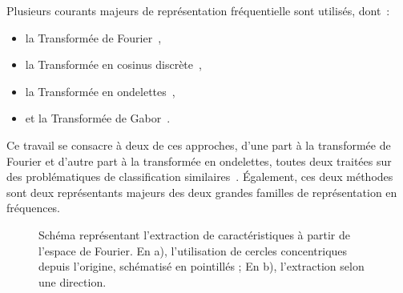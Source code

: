 Plusieurs courants majeurs de représentation fréquentielle sont utilisés, dont~:~
\begin{itemize}
    \item la Transformée de Fourier~\cite{Ursani2007, Smach2008a},
    \item la Transformée en cosinus discrète~\cite{Sorwar2001},
    \item la Transformée en ondelettes~\cite{Arivazhagan2003,Hong2010},
    \item et la Transformée de Gabor~\cite{Ursani2007}.
\end{itemize}
Ce travail se consacre à deux de ces approches, d'une part à la transformée de Fourier et d'autre part à la transformée en ondelettes, toutes deux traitées sur des problématiques de classification similaires~\cite{Wiltgen2008,Halimi2017a,Halimi2017b}. Également, ces deux méthodes sont deux représentants majeurs des deux grandes familles de représentation en fréquences.\par

\begin{figure}[h]
    \begin{center}
        \qquad
    \end{center}
    \caption{Schéma représentant l'extraction de caractéristiques à partir de l'espace de Fourier. En a), l'utilisation de cercles concentriques depuis l'origine, schématisé en pointillés ; En b), l'extraction selon une direction.}
    \label{fig:scheme_fourier_features}
\end{figure}\par

